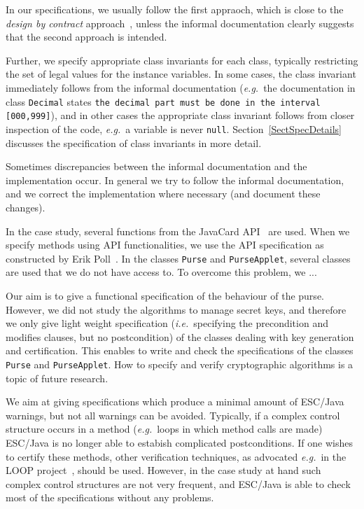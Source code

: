 \documentclass[a4paper]{llncs}
\newcommand{\comment}[1]{\marginpar{\framebox{\begin{minipage}{\marginparwidth}{#1}\end{minipage}}}}
\begin{document}
In our specifications, we usually follow the first appraoch, which
is close to the \emph{design by contract} approach~\cite{Meyer97},
unless the informal documentation clearly suggests that the second
approach is intended.

Further, we specify appropriate class invariants for each class,
typically restricting the set of legal values for the instance
variables. In some cases, the class invariant immediately follows from
the informal documentation (\emph{e.g.}~the documentation in class
\texttt{Decimal} states
\texttt{the decimal part must be done in the interval [000,999]}), and
in other cases the appropriate class invariant follows from closer
inspection of the code, \emph{e.g.}~a variable is never \texttt{null}.
Section~\ref{SectSpecDetails} discusses the specification of class
invariants in more detail.

Sometimes discrepancies between the informal documentation and the
implementation occur. In general we try to follow the informal
documentation, and we correct the implementation where necessary
(and document these changes). 

In the case study, several functions from the JavaCard
API~\cite{?} are used. When we specify methods using API
functionalities, we use the API specification as constructed by Erik
Poll~\cite{?}. 
In the classes \texttt{Purse} and \texttt{PurseApplet}, several
classes are used that we do not have access to. To overcome this
problem, we ... \comment{What do we do? Does the Houdini paper give a
solution?} 

Our aim is to give a functional specification of the behaviour of the
purse. However, we did not study the algorithms to manage secret keys,
and therefore we only give light weight specification
(\emph{i.e.}~specifying the precondition and modifies clauses, but no
postcondition) of the classes dealing with key generation and
certification. This enables to write and check the specifications of
the classes \texttt{Purse} and \texttt{PurseApplet}. How to specify
and verify cryptographic algorithms is a topic of future research.

We aim at giving specifications which produce a minimal amount of
ESC/Java warnings, but not all warnings can be avoided. Typically, if
a complex control structure occurs in a method (\emph{e.g.}~loops in
which method calls are made) ESC/Java is no longer able to estabish
complicated postconditions. If one wishes to certify these methods,
other verification techniques, as advocated \emph{e.g.}~in the LOOP
project~\cite{LOOPUrl}, should be used. However, in the case study at
hand such complex control structures are not very frequent, and
ESC/Java is able to check most of the specifications without any
problems.
\end{document}
